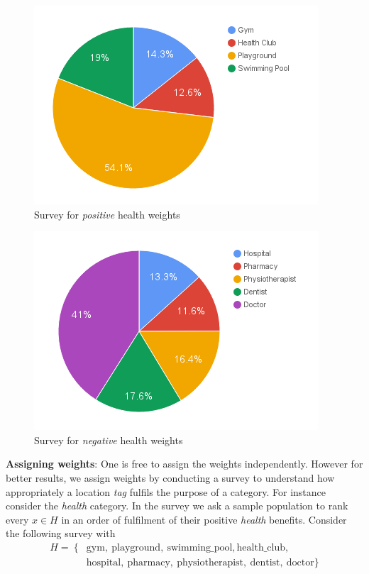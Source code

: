 \documentclass[conference]{IEEEtran}
\begin{document}
\begin{figure}[h!]
\centering
\captionsetup{justification=centering}
\noindent \includegraphics[scale=0.6]{fig2}
\caption{Survey for \textit{positive} health weights}
\end{figure}
\begin{figure}[h!]
\centering
\captionsetup{justification=centering}
\noindent \includegraphics[scale=0.6]{fig3}
\caption{Survey for \textit{negative} health weights}
\end{figure}
\textbf{Assigning weights}: One is free to assign the weights independently. However for better results, we assign weights by conducting a survey to understand how appropriately a location \textit{tag} fulfils the purpose of a category. For instance consider the \textit{health} category. In the survey we ask a sample population to rank every $x \in H$ in an order of fulfilment of their positive \textit{health} benefits. Consider the following survey with 
\begin{align*}
H =\ \{&\text{gym},\ \text{playground},\ \text{swimming\_pool}, \text{health\_club},\\
&\text{hospital},\ \text{pharmacy},\ \text{physiotherapist},\ \text{dentist},\ \text{doctor}\}
\end{align*}
\end{document}
